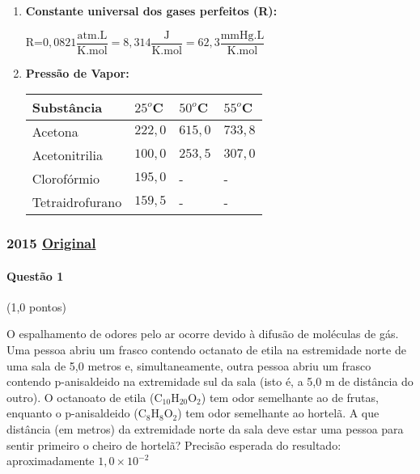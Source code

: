 \documentclass[12pt,a4paper]{article}
\newcommand{\original}[1]{\tiny \href{#1}{Original} \normalsize}
\begin{document}
 \begin{enumerate}[label=\Roman*.]
 \item \textbf{Constante universal dos gases perfeitos (R):} 
 
 \vspace{0.2cm}
 R=$0,0821 \dfrac{\textrm{atm.L}}{\textrm{K.mol}}=8,314 \dfrac{\textrm{J}}{\textrm{K.mol}}=62,3 \dfrac{\textrm{mmHg.L}}{\textrm{K.mol}}$
\vspace{0.3cm} 

\item \textbf{Pressão de Vapor:}

\begin{center}
\begin{tabular}{|l|l|l|l|}
\hline 
Substância & $25^o$C & $50^o$C & $55^o$C \\ \hline
Acetona & $222,0$ & $615,0$  & $733,8$ \\ \hline
Acetonitrilia & $100,0$ & $253,5$ & $307,0$ \\ \hline
Clorofórmio & $195,0$ & - & - \\ \hline
Tetraidrofurano & $159,5$ & - & - \\ \hline
\end{tabular}
\end{center}
 \end{enumerate}
\newpage

\subsubsection{2015 \original{https://drive.google.com/file/d/1pxQy_DI9YyjkB6-nHP5MF1te-C-QRj0H/view?usp=sharing}}

\paragraph{Questão 1} (1,0 pontos)

O espalhamento de odores pelo ar ocorre devido à difusão de moléculas de gás. Uma pessoa abriu um frasco contendo octanato de etila na estremidade norte de uma sala de 5,0 metros e, simultaneamente, outra pessoa abriu um frasco contendo p-anisaldeido na extremidade sul da sala (isto é, a 5,0 m de distância do outro). O octanoato de etila (C$_10$H$_20$O$_2$) tem odor semelhante ao de frutas, enquanto o p-anisaldeido (C$_8$H$_8$O$_2$) tem odor semelhante ao hortelã. A que distância (em metros) da extremidade norte da sala deve estar uma pessoa para sentir primeiro o cheiro de hortelã? Precisão esperada do resultado: aproximadamente $1,0\times 10^{-2}$
\end{document}
